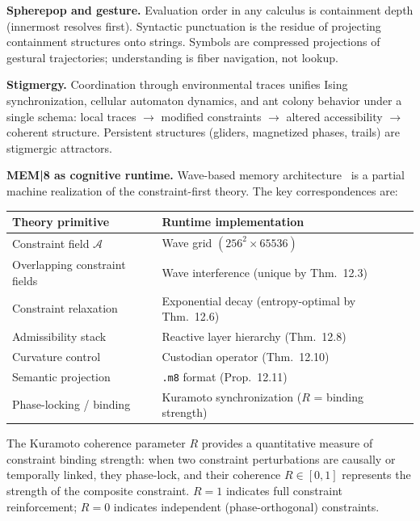 \documentclass[12pt, a4paper, twoside]{article}
\theoremstyle{plain}
\theoremstyle{definition}
\theoremstyle{remark}
\begin{document}
\medskip
\noindent\textbf{Spherepop and gesture.}
Evaluation order in any calculus is containment depth (innermost resolves
first). Syntactic punctuation is the residue of projecting containment
structures onto strings. Symbols are compressed projections of gestural
trajectories; understanding is fiber navigation, not lookup.

\medskip
\noindent\textbf{Stigmergy.}
Coordination through environmental traces unifies Ising synchronization,
cellular automaton dynamics, and ant colony behavior under a single schema:
local traces $\to$ modified constraints $\to$ altered accessibility $\to$
coherent structure. Persistent structures (gliders, magnetized phases, trails)
are stigmergic attractors.

\medskip
\noindent\textbf{MEM|8 as cognitive runtime.}
Wave-based memory architecture~\cite{mem8_2025} is a partial machine realization
of the constraint-first theory. The key correspondences are:

\begin{center}
\renewcommand{\arraystretch}{1.3}
\begin{tabular}{@{}ll@{}}
\toprule
\textbf{Theory primitive} & \textbf{Runtime implementation} \\
\midrule
Constraint field $\mathcal{A}$ & Wave grid $(256^2 \times 65536)$ \\
Overlapping constraint fields   & Wave interference (unique by Thm.~12.3) \\
Constraint relaxation           & Exponential decay (entropy-optimal by Thm.~12.6) \\
Admissibility stack             & Reactive layer hierarchy (Thm.~12.8) \\
Curvature control               & Custodian operator (Thm.~12.10) \\
Semantic projection             & \texttt{.m8} format (Prop.~12.11) \\
Phase-locking / binding         & Kuramoto synchronization ($R$ = binding strength) \\
\bottomrule
\end{tabular}
\end{center}

\noindent The Kuramoto coherence parameter $R$ provides a quantitative measure
of constraint binding strength: when two constraint perturbations are causally
or temporally linked, they phase-lock, and their coherence $R \in [0,1]$
represents the strength of the composite constraint. $R = 1$ indicates full
constraint reinforcement; $R = 0$ indicates independent (phase-orthogonal)
constraints.
\end{document}
